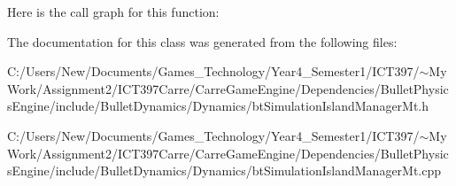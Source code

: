 Here is the call graph for this function:

The documentation for this class was generated from the following files:\begin{CompactItemize}
\item 
C:/Users/New/Documents/Games\_\-Technology/Year4\_\-Semester1/ICT397/$\sim$My Work/Assignment2/ICT397Carre/CarreGameEngine/Dependencies/BulletPhysicsEngine/include/BulletDynamics/Dynamics/btSimulationIslandManagerMt.h\item 
C:/Users/New/Documents/Games\_\-Technology/Year4\_\-Semester1/ICT397/$\sim$My Work/Assignment2/ICT397Carre/CarreGameEngine/Dependencies/BulletPhysicsEngine/include/BulletDynamics/Dynamics/btSimulationIslandManagerMt.cpp\end{CompactItemize}
